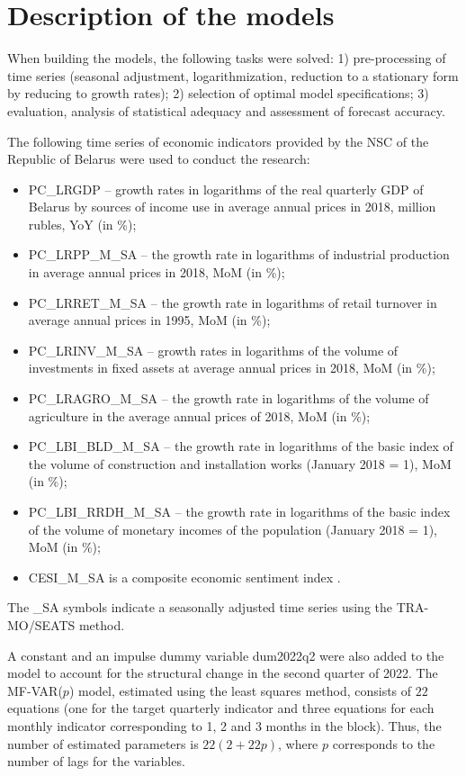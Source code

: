 \documentclass[12pt]{article}
\begin{document}
\section{Description of the models}

When building the models, the following tasks were solved: 1) pre-processing of time series (seasonal adjustment, logarithmization, reduction to a stationary form by reducing to growth rates); 2) selection of optimal model specifications; 3) evaluation, analysis of statistical adequacy and assessment of forecast accuracy.

The following time series of economic indicators provided by the NSC of the Republic of Belarus were used to conduct the research:
\begin{itemize}
	\item PC\_LRGDP -- growth rates in logarithms of the real quarterly GDP of Belarus by sources of income use in average annual prices in 2018, million rubles, YoY (in \%);
	\item PC\_LRPP\_M\_SA -- the growth rate in logarithms of industrial production in average annual prices in 2018, MoM (in \%);
	\item PC\_LRRET\_M\_SA -- the growth rate in logarithms of retail turnover in average annual prices in 1995, MoM (in \%);
	\item PC\_LRINV\_M\_SA -- growth rates in logarithms of the volume of investments in fixed assets at average annual prices in 2018, MoM (in \%);
	\item PC\_LRAGRO\_M\_SA -- the growth rate in logarithms of the volume of agriculture in the average annual prices of 2018, MoM (in \%);
	\item PC\_LBI\_BLD\_M\_SA -- the growth rate in logarithms of the basic index of the volume of construction and installation works (January 2018 = 1), MoM (in \%);
	\item PC\_LBI\_RRDH\_M\_SA -- the growth rate in logarithms of the basic index of the volume of monetary incomes of the population (January 2018 = 1), MoM (in \%);
	\item CESI\_M\_SA is a composite economic sentiment index \cite{5}.
\end{itemize}
The \_SA symbols indicate a seasonally adjusted time series using the TRA-MO/SEATS method.

A constant and an impulse dummy variable dum2022q2 were also added to the model to account for the structural change in the second quarter of 2022. The MF-VAR($p$) model, estimated using the least squares method, consists of $22$ equations (one for the target quarterly indicator and three equations for each monthly indicator corresponding to 1, 2 and 3 months in the block). Thus, the number of estimated parameters is $22(2+22 p)$, where $p$ corresponds to the number of lags for the variables.
\end{document}
